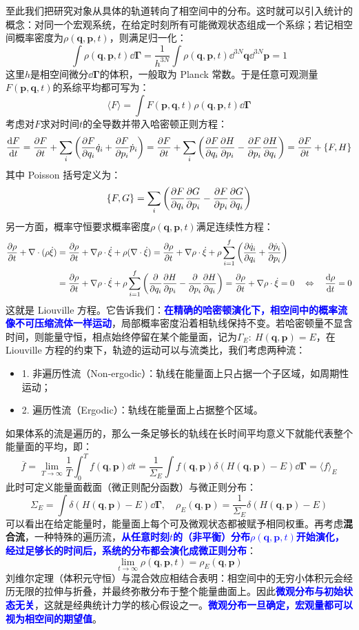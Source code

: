 至此我们把研究对象从具体的轨道转向了相空间中的分布。这时就可以引入统计的概念：对同一个宏观系统，在给定时刻所有可能微观状态组成一个系综；若记相空间概率密度为$\rho(\bm{q},\bm{p},t)$，则满足归一化：
\[\int\rho(\bm{q},\bm{p},t)\dd\bm{\Gamma}=\frac{1}{h^{3N}}\int\rho(\bm{q},\bm{p},t)\dd^{3N}\bm{q}\dd^{3N}\bm{p}=1\]
这里$h$是相空间微分$\dd{\bm{\Gamma}}$的体积，一般取为 Planck 常数。于是任意可观测量$F(\bm{p},\bm{q},t)$的系综平均都可写为：
\[\langle F \rangle=\int F(\bm{p},\bm{q},t)\rho(\bm{q},\bm{p},t)\dd{\bm{\Gamma}}\]
考虑对$F$求对时间$t$的全导数并带入哈密顿正则方程：
\[\dv{F}{t}=\pdv{F}{t}+\sum_i\left(\pdv{F}{q_i}\dot{q}_i+\pdv{F}{p_i}\dot{p}_i\right)=\pdv{F}{t}+\sum_i\left(\pdv{F}{q_i}\pdv{H}{p_i}-\pdv{F}{p_i}\pdv{H}{q_i}\right)=\pdv{F}{t}+\{F,H\}\]
其中 Poisson 括号定义为：
\[\{F,G\}=\sum_i\left(\pdv{F}{q_i}\pdv{G}{p_i}-\pdv{F}{p_i}\pdv{G}{q_i}\right)\]
另一方面，概率守恒要求概率密度$\rho(\bm{q},\bm{p},t)$满足连续性方程：
\[\begin{aligned}
\pdv{\rho}{t}+\nabla\cdot(\rho \dot{\xi})&=\pdv{\rho}{t}+\nabla\rho\cdot\dot{\xi}+\rho(\nabla\cdot\dot{\xi})=\pdv{\rho}{t}+\nabla\rho\cdot\dot{\xi}+\rho\sum_{i=1}^{f}\left(\pdv{\dot{q}_i}{q_i}+\pdv{\dot{p}_i}{p_i}\right)\\
&=\pdv{\rho}{t}+\nabla\rho\cdot\dot{\xi}+\rho\sum_{i=1}^{f}\left(\pdv{}{q_i}\pdv{H}{p_i}-\pdv{}{p_i}\pdv{H}{q_i}\right)=\pdv{\rho}{t}+\nabla\rho\cdot\dot{\xi}=0 \quad \Leftrightarrow \quad \dv{\rho}{t}=0
\end{aligned}\]
这就是 Liouville 方程。它告诉我们：\textcolor{blue}{\textbf{在精确的哈密顿演化下，相空间中的概率流像不可压缩流体一样运动}}，局部概率密度沿着相轨线保持不变。若哈密顿量不显含时间，则能量守恒，相点始终停留在某个能量面，记为$\Gamma_E:\ H(\bm{q},\bm{p})=E$，在 Liouville 方程的约束下，轨迹的运动可以与流类比，我们考虑两种流：
\begin{itemize}
\item 1. 非遍历性流（Non-ergodic）：轨线在能量面上只占据一个子区域，如周期性运动；
\item 2. 遍历性流（Ergodic）：轨线在能量面上占据整个区域。
\end{itemize}
如果体系的流是遍历的，那么一条足够长的轨线在长时间平均意义下就能代表整个能量面的平均，即：
\[\overline{f}=\lim_{T\to\infty}\frac{1}{T}\int_0^T f(\bm{q},\bm{p})\dd t=\frac{1}{\Sigma_E}\int f(\bm{q},\bm{p})\delta(H(\bm{q},\bm{p})-E)\dd{\bm{\Gamma}}=\langle f \rangle_E\]
此时可定义能量面截面（微正则配分函数）与微正则分布：
\[\Sigma_E=\int\delta(H(\bm{q},\bm{p})-E)\dd{\bm{\Gamma}}, \quad \rho_E(\bm{q},\bm{p})=\frac{1}{\Sigma_E}\delta(H(\bm{q},\bm{p})-E)\]
可以看出在给定能量时，能量面上每个可及微观状态都被赋予相同权重。再考虑\textbf{混合流}，一种特殊的遍历流，\textcolor{blue}{\textbf{从任意时刻$t$的（非平衡）分布$\rho(\bm{q},\bm{p},t)$开始演化，经过足够长的时间后，系统的分布都会演化成微正则分布}}：
\[\lim_{t\to\infty}\rho(\bm{q},\bm{p},t)=\rho_E(\bm{q},\bm{p})\]
刘维尔定理（体积元守恒）与混合效应相结合表明：相空间中的无穷小体积元会经历无限的拉伸与折叠，并最终弥散分布于整个能量曲面上。因此\textcolor{blue}{\textbf{微观分布与初始状态无关}}，这就是经典统计力学的核心假设之一。\textcolor{blue}{\textbf{微观分布一旦确定，宏观量都可以视为相空间的期望值}}。

